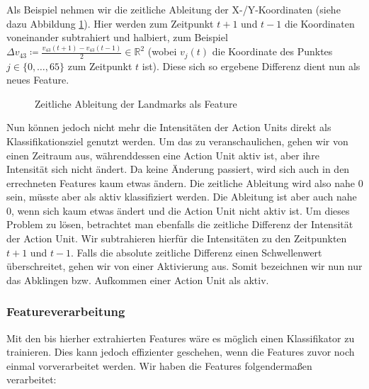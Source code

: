 Als Beispiel nehmen wir die zeitliche Ableitung der X-/Y-Koordinaten (siehe dazu Abbildung \ref{fig:timediff}).
Hier werden zum Zeitpunkt $t+1$ und $t-1$ die Koordinaten voneinander
subtrahiert und halbiert, zum Beispiel $\Delta v_{43} \coloneqq \frac{v_{43}(t+1) - v_{43}(t-1)}{2}\in\mathbb{R}^2$ (wobei $v_{j}(t)$ die Koordinate des Punktes $j\in\{0,\ldots,65\}$ zum Zeitpunkt $t$ ist).
Diese sich so ergebene Differenz dient nun als neues Feature.

\begin{figure}
  \center

\caption{Zeitliche Ableitung der Landmarks als Feature}
\label{fig:timediff}
\end{figure}

Nun können jedoch nicht mehr die Intensitäten der Action Units direkt als
Klassifikationsziel genutzt werden.
Um das zu veranschaulichen, gehen wir von einen Zeitraum aus, währenddessen eine
Action Unit aktiv ist, aber ihre Intensität sich nicht ändert.
Da keine Änderung passiert, wird sich auch in den errechneten Features kaum etwas
ändern. Die zeitliche Ableitung wird also nahe $0$ sein, müsste aber als aktiv
klassifiziert werden. Die Ableitung ist aber auch nahe $0$, wenn sich kaum etwas
ändert und die Action Unit nicht aktiv ist.
Um dieses Problem zu lösen, betrachtet man ebenfalls die zeitliche Differenz der
Intensität der Action Unit. Wir subtrahieren hierfür die Intensitäten zu den
Zeitpunkten $t+1$ und $t-1$. Falls die absolute zeitliche Differenz einen
Schwellenwert überschreitet, gehen wir von einer Aktivierung aus. Somit bezeichnen wir nun nur das Abklingen bzw. Aufkommen einer Action Unit als aktiv.

\subsubsection{Featureverarbeitung}
Mit den bis hierher extrahierten Features wäre es möglich einen Klassifikator zu trainieren. Dies kann jedoch effizienter geschehen,
wenn die Features zuvor noch einmal vorverarbeitet werden. Wir haben die Features folgendermaßen verarbeitet:

